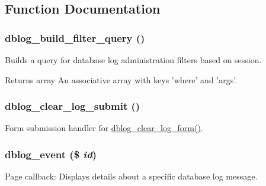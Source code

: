 \subsection{Function Documentation}
\hypertarget{dblog_8admin_8inc_aaeb52aeee42e8fe89e517a509ee30b19}{
\subsubsection[{dblog\_\-build\_\-filter\_\-query}]{\setlength{\rightskip}{0pt plus 5cm}dblog\_\-build\_\-filter\_\-query ()}}
\label{dblog_8admin_8inc_aaeb52aeee42e8fe89e517a509ee30b19}
Builds a query for database log administration filters based on session.

\begin{DoxyReturn}{Returns}
array An associative array with keys 'where' and 'args'. 
\end{DoxyReturn}
\hypertarget{dblog_8admin_8inc_aaac30c26ee5c21e148bd0783855f2a87}{
\subsubsection[{dblog\_\-clear\_\-log\_\-submit}]{\setlength{\rightskip}{0pt plus 5cm}dblog\_\-clear\_\-log\_\-submit ()}}
\label{dblog_8admin_8inc_aaac30c26ee5c21e148bd0783855f2a87}
Form submission handler for \hyperlink{group__forms_gad4ec60fb6fd40f5ae8691709f2b9affb}{dblog\_\-clear\_\-log\_\-form()}. \hypertarget{dblog_8admin_8inc_a044370b32b7cc5cace449cb62bf6c007}{
\subsubsection[{dblog\_\-event}]{\setlength{\rightskip}{0pt plus 5cm}dblog\_\-event (\$ {\em id})}}
\label{dblog_8admin_8inc_a044370b32b7cc5cace449cb62bf6c007}
Page callback: Displays details about a specific database log message.


